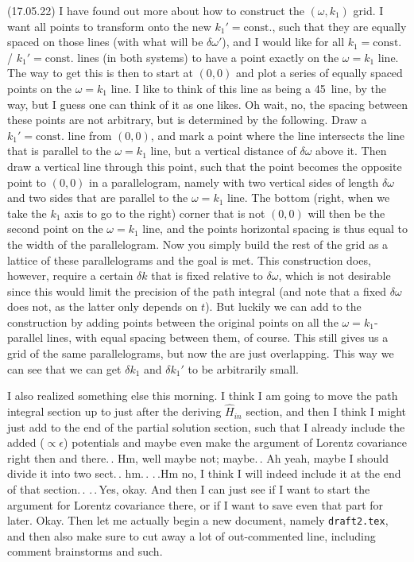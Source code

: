 \documentclass{report}
\begin{document}
(17.05.22) I have found out more about how to construct the $(\omega, k_1)$ grid. I want all points to transform onto the new $k_1'=\mathrm{const.}$, such that they are equally spaced on those lines (with what will be $\delta\omega'$), and I would like for all $k_1=\mathrm{const.}$ / $k_1'=\mathrm{const.}$ lines (in both systems) to have a point exactly on the $\omega=k_1$ line. The way to get this is then to start at $(0,0)$ and plot a series of equally spaced points on the $\omega=k_1$ line. I like to think of this line as being a 45\textdegree\ line, by the way, but I guess one can think of it as one likes. Oh wait, no, the spacing between these points are not arbitrary, but is determined by the following. Draw a $k_1'=\mathrm{const.}$ line from $(0,0)$, and mark a point where the line intersects the line that is parallel to the $\omega = k_1$ line, but a vertical distance of $\delta\omega$ above it. Then draw a vertical line through this point, such that the point becomes the opposite point to $(0,0)$ in a parallelogram, namely with two vertical sides of length $\delta\omega$ and two sides that are parallel to the $\omega=k_1$ line. The bottom (right, when we take the $k_1$ axis to go to the right) corner that is not $(0,0)$ will then be the second point on the $\omega=k_1$ line, and the points horizontal spacing is thus equal to the width of the parallelogram. Now you simply build the rest of the grid as a lattice of these parallelograms and the goal is met. This construction does, however, require a certain $\delta k$ that is fixed relative to $\delta\omega$, which is not desirable since this would limit the precision of the path integral (and note that a fixed $\delta\omega$ does not, as the latter only depends on $t$). But luckily we can add to the construction by adding points between the original points on all the $\omega=k_1$-parallel lines, with equal spacing between them, of course. This still gives us a grid of the same parallelograms, but now the are just overlapping. This way we can see that we can get $\delta k_1$ and $\delta k_1'$ to be arbitrarily small. 

I also realized something else this morning. I think I am going to move the path integral section up to just after the deriving $\hat H_{in}$ section, and then I think I might just add to the end of the partial solution section, such that I already include the added ($\propto\epsilon$) potentials and maybe even make the argument of Lorentz covariance right then and there.\,. Hm, well maybe not; maybe.\,. Ah yeah, maybe I should divide it into two sect.\,. hm.\,. .\,.Hm no, I think I will indeed include it at the end of that section.\,. .\,.\,Yes, okay. And then I can just see if I want to start the argument for Lorentz covariance there, or if I want to save even that part for later. Okay. Then let me actually begin a new document, namely \texttt{draft2.tex}, and then also make sure to cut away a lot of out-commented line, including comment brainstorms and such. %
\end{document}
